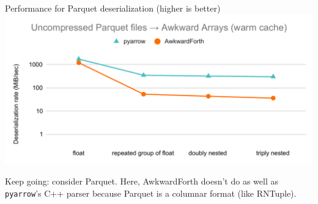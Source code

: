 \documentclass[aspectratio=169]{beamer}
\begin{document}
\begin{frame}{Performance for Parquet deserialization (higher is better)}
\large
\vspace{0.2 cm}
\includegraphics[width=0.95\linewidth]{AwkwardForth-performance-Parquet.pdf}

Keep going: consider Parquet. Here, AwkwardForth doesn't do as well as \texttt{pyarrow}'s C++ parser because Parquet is a columnar format (like RNTuple).
\end{frame}
\end{document}
